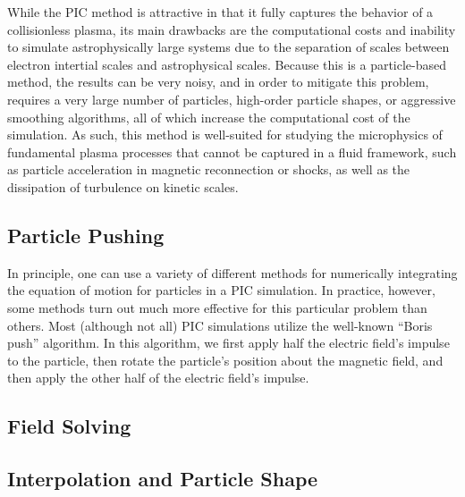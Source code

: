 While the PIC method is attractive in that it fully captures the behavior of a collisionless plasma, its main drawbacks are the computational costs and inability to simulate astrophysically large systems due to the separation of scales between electron intertial scales and astrophysical scales.  Because this is a particle-based method, the results can be very noisy, and in order to mitigate this problem, requires a very large number of particles, high-order particle shapes, or aggressive smoothing algorithms, all of which increase the computational cost of the simulation.  As such, this method is well-suited for studying the microphysics of fundamental plasma processes that cannot be captured in a fluid framework, such as particle acceleration in magnetic reconnection or shocks, as well as the dissipation of turbulence on kinetic scales.  

\subsection{Particle Pushing}
In principle, one can use a variety of different methods for numerically integrating the equation of motion for particles in a PIC simulation.  In practice, however, some methods turn out much more effective for this particular problem than others.  Most (although not all) PIC simulations utilize the well-known ``Boris push'' algorithm.  In this algorithm, we first apply half the electric field's impulse to the particle, then rotate the particle's position about the magnetic field, and then apply the other half of the electric field's impulse. 
\subsection{Field Solving}
\subsection{Interpolation and Particle Shape}


